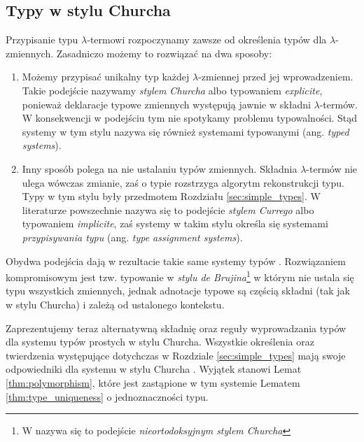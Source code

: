 \subsection{Typy w stylu Churcha}\label{subsec:church_style}
Przypisanie typu \(\lambda\)-termowi rozpoczynamy zawsze od określenia typów dla \(\lambda\)-zmiennych. Zasadniczo możemy to rozwiązać na dwa sposoby:

\begin{enumerate}
  \item Możemy przypisać unikalny typ każdej \(\lambda\)-zmiennej przed jej wprowadzeniem. Takie podejście nazywamy \emph{stylem Churcha} albo typowaniem \emph{explicite}, ponieważ deklaracje typowe zmiennych występują jawnie w składni \(\lambda\)-termów. W konsekwencji w podejściu tym nie spotykamy problemu typowalności. Stąd systemy w tym stylu nazywa się również systemami {typowanymi} (ang. \emph{typed systems}).
  \item Inny sposób polega na nie ustalaniu typów zmiennych. Składnia \(\lambda\)-termów nie ulega wówczas zmianie, zaś o typie rozstrzyga algorytm rekonstrukcji typu. Typy w tym stylu były przedmotem Rozdziału \ref{sec:simple_types}. W literaturze powszechnie nazywa się to podejście \emph{stylem Currego} albo typowaniem \emph{implicite}, zaś systemy w takim stylu określa się systemami \emph{przypisywania typu} (ang. \emph{type assignment systems}).
\end{enumerate}

Obydwa podejścia dają w rezultacie takie same systemy typów \cite[Rozdział 3.4]{Urzyczyn2006}.  %
Rozwiązaniem kompromisowym jest tzw. typowanie w \emph{stylu de Brujina}\footnote{W \cite{Urzyczyn2006} nazywa się to podejście \emph{nieortodoksyjnym stylem Churcha}} \cite[1A.33]{barendregt_dekkers_statman_2013} w którym nie ustala się typu wszystkich zmiennych, jednak adnotacje typowe są częścią składni (tak jak w stylu Churcha) i zależą od ustalonego kontekstu. 

Zaprezentujemy teraz alternatywną składnię oraz reguły wyprowadzania typów dla systemu typów prostych w stylu Churcha. Wszystkie określenia oraz twierdzenia występujące dotychczas w Rozdziale \ref{sec:simple_types} mają swoje odpowiedniki dla systemu w stylu Churcha \cite[Rozdział 2.10]{nederpelt_geuvers_2014}. Wyjątek stanowi Lemat \ref{thm:polymorphism}, które jest zastąpione w tym systemie Lematem \ref{thm:type_uniqueness} o jednoznaczności typu.

